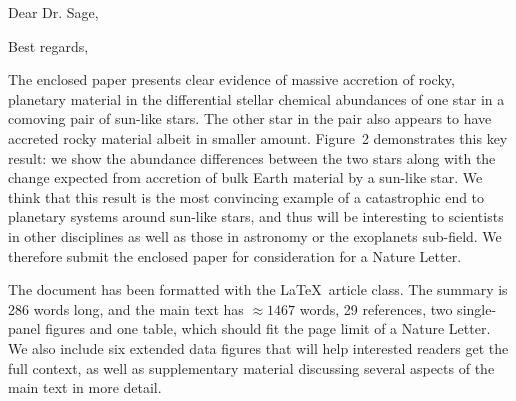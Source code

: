 \documentclass[12pt,letter,roman]{moderncv}
\begin{document}
\date{\today}
\opening{Dear Dr. Sage,}
\closing{Best regards,}
\makelettertitle

The enclosed paper presents clear evidence of massive accretion of rocky,
planetary material in the differential stellar chemical abundances of one star
in a comoving pair of sun-like stars. The other star in the pair also appears
to have accreted rocky material albeit in smaller amount. Figure~2 demonstrates
this key result: we show the abundance differences between the two stars
along with the change expected from accretion of bulk Earth material by a
sun-like star. We think that this result is the most convincing example of a
catastrophic end to planetary systems around sun-like stars, and thus will be
interesting to scientists in other disciplines as well as those in astronomy or
the exoplanets sub-field. We therefore submit the enclosed paper for
consideration for a Nature Letter.

The document has been formatted with the \LaTeX\ article class.
The summary is 286 words long, and the main text has $\approx 1467$ words, 29
references, two single-panel figures and one table, which should fit the page
limit of a Nature Letter.
We also include six extended data figures that will help interested readers
get the full context, as well as supplementary material discussing several
aspects of the main text in more detail.

\vspace{0.5cm}


\makeletterclosing
\end{document}

